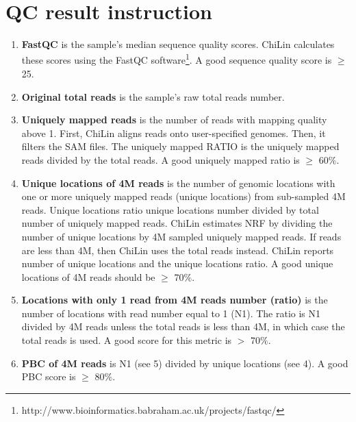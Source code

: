 \appendix
\part{QC result instruction}
\begin{enumerate}
\item{\textbf{FastQC} is the sample's median sequence quality scores. ChiLin calculates these scores using the FastQC software\footnote{http://www.bioinformatics.babraham.ac.uk/projects/fastqc/}. A good sequence quality score is $\geq$ 25.}
\item{\textbf{Original total reads} is the sample's raw total reads number.}
\item{\textbf{Uniquely mapped reads} is the number of reads with mapping quality above 1. First, ChiLin aligns reads onto user-specified genomes. Then, it filters the SAM files. The uniquely mapped RATIO is the uniquely mapped reads divided by the total reads. A good uniquely mapped ratio is $\geq$ 60$\%$}.
\item{\textbf{Unique locations of 4M reads} is the number of genomic locations with one or more uniquely mapped reads (unique locations) from sub-sampled 4M reads. Unique locations ratio unique locations number divided by total number of uniquely mapped reads. ChiLin estimates NRF by dividing the number of unique locations by 4M sampled uniquely mapped reads. If reads are less than 4M, then ChiLin uses the total reads instead. ChiLin reports number of unique locations and the unique locations ratio. A good unique locations of 4M reads should be $\geq$ 70$\%$. }
\item{\textbf{Locations with only 1 read from 4M reads number (ratio)} is the number of locations with read number equal to 1 (N1). The ratio is N1 divided by 4M reads unless the total reads is less than 4M, in which case the total reads is used. A good score for this metric is $>$ 70$\%$.}
\item{\textbf{PBC of 4M reads} is N1 (see 5) divided by unique locations (see 4). A good PBC score is $\geq$ 80$\%$.}
  

\end{enumerate}
